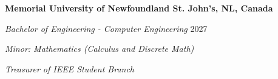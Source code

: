 \textbf{Memorial University of Newfoundland \hfill St. John's, NL, Canada} \par
\textit{Bachelor of Engineering - Computer Engineering} \hfill 2027 \par
\textit{Minor: Mathematics (Calculus and Discrete Math)} \par
\textit{Treasurer of IEEE Student Branch}